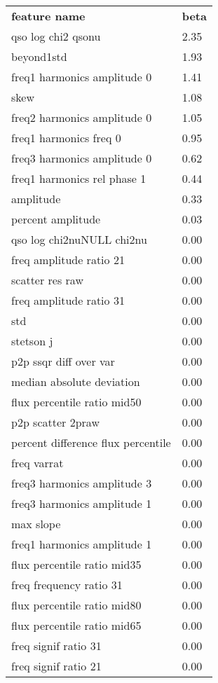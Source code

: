 \begin{center}
\begin{tabular}{ | l | l |}
\hline
\textbf{feature name} & \textbf{beta} \\
qso log chi2 qsonu & 2.35\\
beyond1std & 1.93\\
freq1 harmonics amplitude 0 & 1.41\\
skew & 1.08\\
freq2 harmonics amplitude 0 & 1.05\\
freq1 harmonics freq 0 & 0.95\\
freq3 harmonics amplitude 0 & 0.62\\
freq1 harmonics rel phase 1 & 0.44\\
amplitude & 0.33\\
percent amplitude & 0.03\\
qso log chi2nuNULL chi2nu & 0.00\\
freq amplitude ratio 21 & 0.00\\
scatter res raw & 0.00\\
freq amplitude ratio 31 & 0.00\\
std & 0.00\\
stetson j & 0.00\\
p2p ssqr diff over var & 0.00\\
median absolute deviation & 0.00\\
flux percentile ratio mid50 & 0.00\\
p2p scatter 2praw & 0.00\\
percent difference flux percentile & 0.00\\
freq varrat & 0.00\\
freq3 harmonics amplitude 3 & 0.00\\
freq3 harmonics amplitude 1 & 0.00\\
max slope & 0.00\\
freq1 harmonics amplitude 1 & 0.00\\
flux percentile ratio mid35 & 0.00\\
freq frequency ratio 31 & 0.00\\
flux percentile ratio mid80 & 0.00\\
flux percentile ratio mid65 & 0.00\\
freq signif ratio 31 & 0.00\\
freq signif ratio 21 & 0.00\\
\hline
\end{tabular}
\end{center}